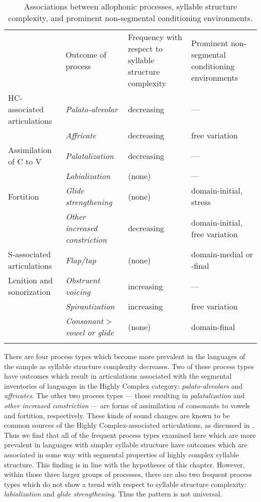 \begin{table}
\begin{tabularx}{\textwidth}{XXXX}
\lsptoprule
 & Outcome of process & Frequency with respect to syllable structure complexity & Prominent non-segmental conditioning environments\\
HC-associated articulations & \textit{Palato-alveolar} & decreasing & —\\
 & \textit{Affricate} & decreasing & free variation\\\tablevspace
Assimilation of C to V & \textit{Palatalization} & decreasing & —\\
 & \textit{Labialization} & (none) & —\\\tablevspace
Fortition & \textit{Glide strengthening} & (none) & domain-initial, stress\\
& \textit{Other increased constriction} & decreasing & domain-initial, free variation\\\tablevspace
S-associated articulations & \textit{Flap/tap} & (none) & domain-medial or -final\\\tablevspace
Lenition and sonorization & \textit{Obstruent voicing} & increasing & —\\
& \textit{Spirantization} & increasing & free variation\\
& \textit{Consonant} > \textit{vowel or glide} & (none) & domain-final\\
\lspbottomrule
\end{tabularx}
\caption{\label{tab:7.7}Associations between allophonic processes, syllable structure complexity, and prominent non-segmental conditioning environments.}
\end{table}

  There are four process types which become more prevalent in the languages of the sample as syllable structure complexity decreases. Two of these process types have outcomes which result in articulations associated with the segmental inventories of languages in the Highly Complex category: \textit{palato-alveolars} and \textit{affricates}. The other two process types — those resulting in \textit{palatalization} and \textit{other increased constriction} — are forms of assimilation of consonants to vowels and fortition, respectively. These kinds of sound changes are known to be common sources of the Highly Complex-associated articulations, as discussed in . Thus we find that all of the frequent process types examined here which are more prevalent in languages with simpler syllable structure have outcomes which are associated in some way with segmental properties of highly complex syllable structure. This finding is in line with the hypotheses of this chapter. However, within those three larger groups of processes, there are also two frequent process types which do not show a trend with respect to syllable structure complexity: \textit{labialization} and \textit{glide strengthening}. Thus the pattern is not universal.


